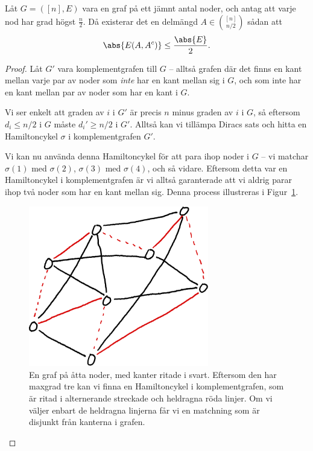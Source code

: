 \documentclass[nobib]{tufte-handout}
\begin{document}
\begin{proposition}
  Låt $G = ([n], E)$ vara en graf på ett jämnt antal noder, och antag att varje nod har grad högst $\frac{n}{2}$. Då existerar det en delmängd $A \in \binom{[n]}{n/2}$ sådan att
  $$\abs{E(A, A^c)} \leq \frac{\abs{E}}{2}.$$ 

  \begin{proof}
    Låt $G'$ vara komplementgrafen till $G$ -- alltså grafen där det finns en kant mellan varje par av noder som \emph{inte} har en kant mellan sig i $G$, och som inte har en kant mellan par av noder som har en kant i $G$.

    Vi ser enkelt att graden av $i$ i $G'$ är precis $n$ minus graden av $i$ i $G$, så eftersom $d_i \leq n/2$ i $G$ måste $d_i' \geq n/2$ i $G'$. Alltså kan vi tillämpa Diracs sats och hitta en Hamiltoncykel $\sigma$ i komplementgrafen $G'$.

    Vi kan nu använda denna Hamiltoncykel för att para ihop noder i $G$ -- vi matchar $\sigma(1)$ med $\sigma(2)$, $\sigma(3)$ med $\sigma(4)$, och så vidare. Eftersom detta var en Hamiltoncykel i komplementgrafen är vi alltså garanterade att vi aldrig parar ihop två noder som har en kant mellan sig. Denna process illustreras i Figur~\ref{fig:min_bisection_matching}.

    \begin{figure}
      \centering
      \includegraphics[width=0.7\textwidth]{F11/min_bisection_matching.png}
      \caption{En graf på åtta noder, med kanter ritade i svart. Eftersom den har maxgrad tre kan vi finna en Hamiltoncykel i komplementgrafen, som är ritad i alternerande streckade och heldragna röda linjer. Om vi väljer enbart de heldragna linjerna får vi en matchning som är disjunkt från kanterna i grafen.}
      \label{fig:min_bisection_matching}
    \end{figure}


\end{proof}
\end{proposition}
\end{document}

